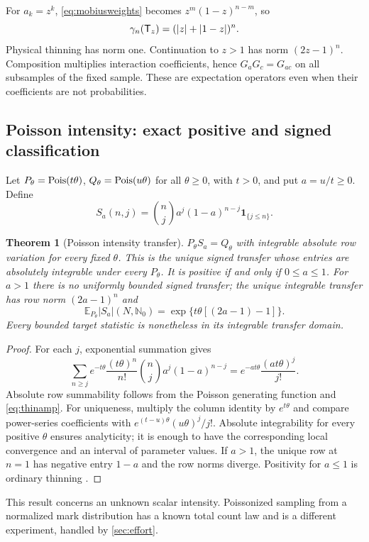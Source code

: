 \documentclass[11pt]{article}
\numberwithin{equation}{section}
\newtheorem{theorem}{Theorem}[section]
\theoremstyle{definition}
\theoremstyle{remark}
\newcommand{\E}{\mathbb E}\newcommand{\Pp}{\mathbb P}\newcommand{\R}{\mathbb R}\newcommand{\N}{\mathbb N}
\newcommand{\ind}{\mathbf1}\newcommand{\Prob}{\mathcal P}\newcommand{\Ee}{\mathcal E}\newcommand{\Ff}{\mathcal F}
\begin{document}
For $a_k=z^k$, \eqref{eq:mobiusweights} becomes $z^m(1-z)^{n-m}$, so
\begin{equation}\label{eq:thinamp}
 \gamma_n(\mathsf T_z)=(|z|+|1-z|)^n.
\end{equation}
Physical thinning has norm one. Continuation to $z>1$ has norm $(2z-1)^n$. Composition multiplies interaction coefficients, hence $G_aG_c=G_{ac}$ on all subsamples of the fixed sample. These are expectation operators even when their coefficients are not probabilities.

\subsection{Poisson intensity: exact positive and signed classification}
Let $P_\theta=\operatorname{Pois}(t\theta)$, $Q_\theta=\operatorname{Pois}(u\theta)$ for all $\theta\ge0$, with $t>0$, and put $a=u/t\ge0$. Define
\begin{equation}\label{eq:poisS}
 S_a(n,j)=\binom nj a^j(1-a)^{n-j}\ind_{\{j\le n\}}.
\end{equation}
\begin{theorem}[Poisson intensity transfer]\label{thm:pois}
$P_\theta S_a=Q_\theta$ with integrable absolute row variation for every fixed $\theta$. This is the unique signed transfer whose entries are absolutely integrable under every $P_\theta$. It is positive if and only if $0\le a\le1$. For $a>1$ there is no uniformly bounded signed transfer; the unique integrable transfer has row norm $(2a-1)^n$ and
\[
 \E_{P_\theta}|S_a|(N,\N_0)=\exp\{t\theta[(2a-1)-1]\}.
\]
Every bounded target statistic is nonetheless in its integrable transfer domain.
\end{theorem}
\begin{proof}
For each $j$, exponential summation gives
\[
 \sum_{n\ge j}e^{-t\theta}\frac{(t\theta)^n}{n!}
 \binom nj a^j(1-a)^{n-j}
 =e^{-at\theta}\frac{(at\theta)^j}{j!}.
\]
Absolute row summability follows from the Poisson generating function and \eqref{eq:thinamp}. For uniqueness, multiply the column identity by $e^{t\theta}$ and compare power-series coefficients with $e^{(t-u)\theta}(u\theta)^j/j!$. Absolute integrability for every positive $\theta$ ensures analyticity; it is enough to have the corresponding local convergence and an interval of parameter values. If $a>1$, the unique row at $n=1$ has negative entry $1-a$ and the row norms diverge. Positivity for $a\le1$ is ordinary thinning \cite[Theorem 5.8 and Corollary 5.9]{LastPenrose2017}.
\end{proof}
This result concerns an unknown scalar intensity. Poissonized sampling from a normalized mark distribution has a known total count law and is a different experiment, handled by \cref{sec:effort}.
\end{document}
